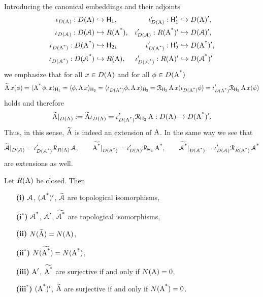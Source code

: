 \documentclass[a4paper]{amsart}
\renewcommand{\H}{\mathsf{H}}
\renewcommand{\R}{\mathcal{R}}
\begin{document}
Introducing the canonical embeddings and their adjoints
\begin{align*}
\iota_{D(\A)}:D(\A)&\hookrightarrow\H_{1},
&
\iota_{D(\A)}':\H_{1}'&\hookrightarrow D(\A)',\\
\iota_{D(\cA)}:D(\cA)&\hookrightarrow R(\As),
&
\iota_{D(\cA)}':R(\As)'&\hookrightarrow D(\cA)',\\
\iota_{D(\As)}:D(\As)&\hookrightarrow\H_{2},
&
\iota_{D(\As)}':\H_{2}'&\hookrightarrow D(\As)',\\
\iota_{D(\cAs)}:D(\cAs)&\hookrightarrow R(\A),
&
\iota_{D(\cAs)}':R(\A)'&\hookrightarrow D(\cAs)'
\end{align*}
we emphasize that for all  $x\in D(\operatorname{A})$ and for all $\phi\in D(\operatorname{\operatorname{A}^{*}})$
$$\widetilde{\A}\,x(\phi)
=\scp{\As\phi}{x}_{\H_{1}}
=\scp{\phi}{\A x}_{\H_{2}}
=\scp{\iota_{D(\As)}\phi}{\A x}_{\H_{2}}
=\R_{\H_{2}}\A x(\iota_{D(\As)}\phi)
=\iota_{D(\As)}'\R_{\H_{2}}\A x(\phi)$$
holds and therefore 
$$\widetilde{\A}|_{D(\A)}:=\widetilde{\A}\iota_{D(\A)}=\iota_{D(\As)}'\R_{\H_{2}}\A:D(\A)\to D(\As)'.$$
Thus, in this sense, $\widetilde{\operatorname{A}}$ is indeed an extension of $\operatorname{A}$.
In the same way we see that
$$\widetilde{\cA}|_{D(\cA)}=\iota_{D(\cAs)}'\R_{R(\A)}\cA,\qquad
\widetilde{\As}|_{D(\As)}=\iota_{D(\A)}'\R_{\H_{1}}\As,\qquad
\widetilde{\cAs}|_{D(\cAs)}=\iota_{D(\cA)}'\R_{R(\As)}\cAs$$
are extensions as well.

\begin{lem}
Let $R(\operatorname{A})$ be closed.
Then 
\begin{itemize}
\item[\bf(i)]
$\operatorname{\mathcal{A}}$, $(\operatorname{\operatorname{\mathcal{A}}^{*}})'$, $\widetilde{\operatorname{\mathcal{A}}}$ are topological isomorphisms,
\item[\bf(i${}^{*}$)]
$\operatorname{\operatorname{\mathcal{A}}^{*}}$, $\operatorname{\mathcal{A}}'$, $\widetilde{\operatorname{\operatorname{\mathcal{A}}^{*}}}$ are topological isomorphisms,
\item[\bf(ii)]
$N(\widetilde{\operatorname{A}})=N(\operatorname{A})$,
\item[\bf(ii${}^{*}$)]
$N(\widetilde{\operatorname{\operatorname{A}^{*}}})=N(\operatorname{\operatorname{A}^{*}})$,
\item[\bf(iii)]
$\operatorname{A}'$, $\widetilde{\operatorname{\operatorname{A}^{*}}}$ are surjective if and only if $N(\operatorname{A})=0$,
\item[\bf(iii${}^{*}$)]
$(\operatorname{\operatorname{A}^{*}})'$, $\widetilde{\operatorname{A}}$ are surjective if and only if $N(\operatorname{\operatorname{A}^{*}})=0$.
\end{itemize}
\end{lem}
\end{document}
